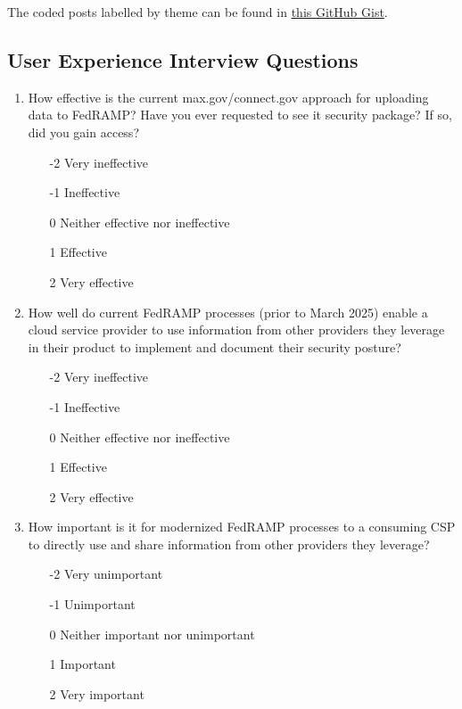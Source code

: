 \documentclass{jdf}
\begin{document}
The coded posts labelled by theme can be found in \href{https://gist.github.com/aj-stein/ffa8bdbe5674a59159d4850aa16fb142}{this GitHub Gist}.

\subsection{User Experience Interview Questions} \label{questionnaire}

\begin{enumerate} 
    \item How effective is the current max.gov/connect.gov approach for uploading data to FedRAMP? Have you ever requested to see it security package? If so, did you gain access?
    \begin{enumerate}
        \item [-2] Very ineffective
        \item [-1] Ineffective
        \item  [0] Neither effective nor ineffective
        \item  [1] Effective 
        \item  [2] Very effective
    \end{enumerate}
    \item How well do current FedRAMP processes (prior to March 2025) enable a cloud service provider to use information from other providers they leverage in their product to implement and document their security posture?
    \begin{enumerate}
        \item [-2] Very ineffective
        \item [-1] Ineffective
        \item  [0] Neither effective nor ineffective
        \item  [1] Effective 
        \item  [2] Very effective
    \end{enumerate}
    \item How important is it for modernized FedRAMP processes to a consuming CSP to directly use and share information from other providers they leverage?
    \begin{enumerate}
        \item [-2] Very unimportant
        \item [-1] Unimportant
        \item  [0] Neither important nor unimportant
        \item  [1] Important
        \item  [2] Very important

\end{enumerate}
\end{enumerate}
\end{document}
